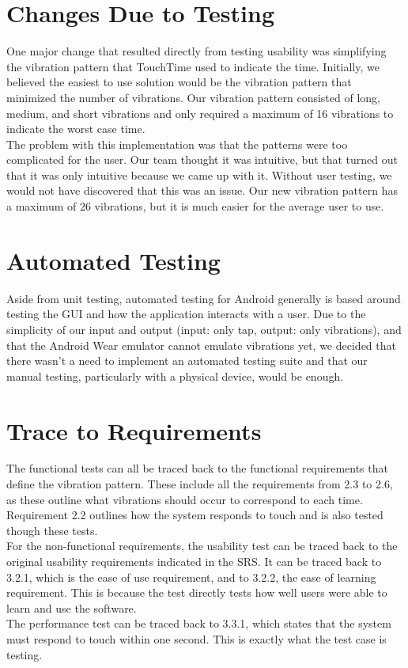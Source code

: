 \documentclass[12pt, titlepage]{article}
\begin{document}
\section{Changes Due to Testing}
One major change that resulted directly from testing usability was simplifying the vibration pattern that TouchTime used to indicate the time. Initially, we believed the easiest to use solution would be the vibration pattern that minimized the number of vibrations. Our vibration pattern consisted of long, medium, and short vibrations and only required a maximum of 16 vibrations to indicate the worst case time.\\
\newline
\noindent
The problem with this implementation was that the patterns were too complicated for the user. Our team thought it was intuitive, but that turned out that it was only intuitive because we came up with it. Without user testing, we would not have discovered that this was an issue. Our new vibration pattern has a maximum of 26 vibrations, but it is much easier for the average user to use.


\section{Automated Testing}
Aside from unit testing, automated testing for Android generally is based around testing the GUI and how the application interacts with a user. Due to the simplicity of our input and output (input: only tap, output: only vibrations), and that the Android Wear emulator cannot emulate vibrations yet, we decided that there wasn't a need to implement an automated testing suite and that our manual testing, particularly with a physical device, would be enough.
		
\section{Trace to Requirements}
The functional tests can all be traced back to the functional requirements that define the vibration pattern. These include all the requirements from 2.3 to 2.6, as these outline what vibrations should occur to correspond to each time. Requirement 2.2 outlines how the system responds to touch and is also tested though these tests.\\
\newline
\noindent
For the non-functional requirements, the usability test can be traced back to the original usability requirements indicated in the SRS. It can be traced back to 3.2.1, which is the ease of use requirement, and to 3.2.2, the ease of learning requirement. This is because the test directly tests how well users were able to learn and use the software.\\
\newline
\noindent
The performance test can be traced back to 3.3.1, which states that the system must respond to touch within one second. This is exactly what the test case is testing.
\end{document}
